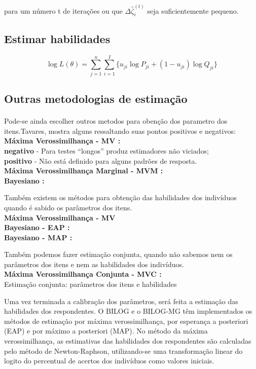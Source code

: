 	para um número t de iterações
	ou que 	$\Delta\hat{\zeta}_i^{(t)}$ seja suficientemente pequeno.
	
	
	\subsection{Estimar habilidades}
	
	\begin{equation}
	\log L(\theta) = \displaystyle\sum\limits_{j = 1}^{n}\displaystyle\sum\limits_{i = 1}^{I}\{u_{ji}\log P_{ji} + (1 - u_{ji}) \log Q_{ji}\}
    \end{equation}
	\subsection{Outras metodologias de estimação}
	\paragraph{}
	    Pode-se ainda escolher outros metodos para obenção dos parametro dos itens.Tavares, mostra alguns ressaltando suas pontos positivos e negativos:\\
    	\textbf{Máxima Verossimilhança - MV :}\\
    	\textbf{negativo} - Para testes “longos” produz estimadores não viciados;\\
    	\textbf{positivo} - Não está definido para alguns padrões de resposta.\\
	    \textbf{Máxima Verossimilhança Marginal - MVM :}\\
	    \textbf{Bayesiano :}\\
	\par
	    Também existem os métodos para obtenção das habilidades dos indivíduos quando é sabido os parâmetros dos itens.\\
	    \textbf{Máxima Verossimilhança - MV}\\
	    \textbf{Bayesiano - EAP :}\\
	    \textbf{Bayesiano - MAP :}\\
	\par
	    Também podemos fazer estimação conjunta, quando  não sabemos nem os parâmetros dos itens e nem as habilidades dos indivíduos.\\
	    \textbf{Máxima Verossimilhança Conjunta - MVC :}\\
	
	Estimação conjunta: parâmetros dos itens e habilidades
	
	Uma vez terminada a calibração dos parâmetros, será feita a estimação
	das habilidades dos respondentes. O BILOG e o BILOG-MG têm implementados
	os métodos de estimação por máxima verossimilhança, por esperança a
	posteriori (EAP) e por máximo a posteriori (MAP). No método da máxima
	verossimilhança, as estimativas das habilidades dos respondentes são calculadas
	pelo método de Newton-Raphson, utilizando-se uma transformação linear
	do logito do percentual de acertos dos indivíduos como valores iniciais.
	
